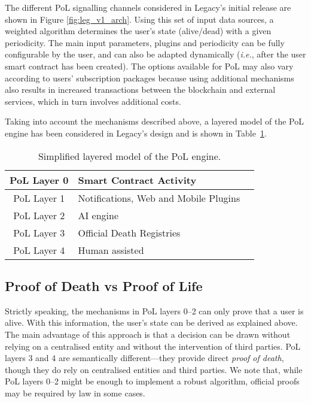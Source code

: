 The different PoL signalling channels considered in Legacy's initial release are shown in Figure \ref{fig:leg_v1_arch}. Using this set of input data sources, a weighted algorithm determines the user's state (alive/dead) with a given periodicity. The main input parameters, plugins and periodicity can be fully configurable by the user, and can also be adapted dynamically (\textit{i.e.}, after the user smart contract has been created). The options available for PoL may also vary according to users' subscription packages because using additional mechanisms also results in increased transactions between the blockchain and external services, which in turn involves additional costs. 

Taking into account the mechanisms described above, a layered model of the PoL engine has been considered in Legacy's design and is shown in Table~\ref{tab:PoL_layers}.

\begin{table}[h]
	\begin{center}		
		{\renewcommand{\arraystretch}{1.3}			
			\begin{tabular}{| c | p{5cm} | p{3.5cm}  |}	
		    \hline	
		    PoL Layer 0 		&  Smart Contract Activity  \\ \hline		    															
			PoL Layer 1 		&  Notifications, Web and Mobile Plugins \\ \hline
			PoL Layer 2         &  AI engine \\ \hline
			PoL Layer 3         &  Official Death Registries  \\ \hline
			PoL Layer 4     	&  Human assisted \\ \hline											
			\end{tabular}				
		}
	\caption{Simplified layered model of the PoL engine.}
	\label{tab:PoL_layers}		
	\end{center}
\end{table}

\subsection*{Proof of Death vs Proof of Life} %
\label{sub:proof_of_death}
Strictly speaking, the mechanisms in PoL layers 0--2 can only prove that a user is alive. With this information, the user's state can be derived as explained above. The main advantage of this approach is that a decision can be drawn without relying on a centralised entity and without the intervention of third parties.
PoL layers 3 and 4 are semantically different---they provide direct \textit{proof of death}, though they do rely on centralised entities and third parties.
We note that, while PoL layers 0--2 might be enough to implement a robust algorithm, official proofs may be required by law in some cases.


